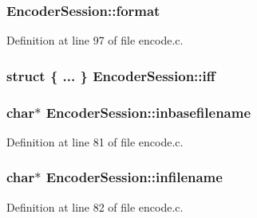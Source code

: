\subsubsection[{\texorpdfstring{format}{format}}]{ Encoder\+Session\+::format}\hypertarget{struct_encoder_session_a7f7fac48234e0c25bc644c055b9b37fd}{}\label{struct_encoder_session_a7f7fac48234e0c25bc644c055b9b37fd}


Definition at line 97 of file encode.\+c.

\subsubsection[{\texorpdfstring{iff}{iff}}]{\setlength{\rightskip}{0pt plus 5cm}struct \{ ... \}   Encoder\+Session\+::iff}\hypertarget{struct_encoder_session_ae551a176bf819ca3bdfd48832f07f115}{}\label{struct_encoder_session_ae551a176bf819ca3bdfd48832f07f115}
\subsubsection[{\texorpdfstring{inbasefilename}{inbasefilename}}]{ char$\ast$ Encoder\+Session\+::inbasefilename}\hypertarget{struct_encoder_session_ad051e4729bbdb184bdffe798630fcfb3}{}\label{struct_encoder_session_ad051e4729bbdb184bdffe798630fcfb3}


Definition at line 81 of file encode.\+c.

\subsubsection[{\texorpdfstring{infilename}{infilename}}]{ char$\ast$ Encoder\+Session\+::infilename}\hypertarget{struct_encoder_session_ac7fa7d425ba62da933034c83d706bfc2}{}\label{struct_encoder_session_ac7fa7d425ba62da933034c83d706bfc2}


Definition at line 82 of file encode.\+c.

